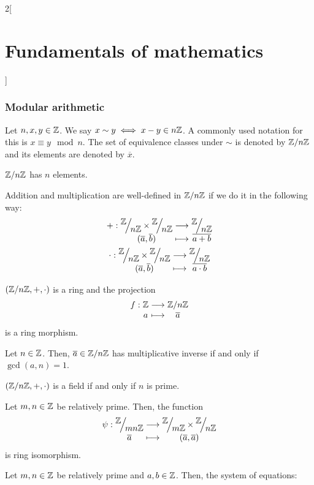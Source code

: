 \documentclass[../../../main_math.tex]{subfiles}
\begin{document}
\begin{multicols}{2}[\section{Fundamentals of mathematics}]
  \subsubsection{Modular arithmetic}
  \begin{definition}
    Let $n,x,y\in\mathbb{Z}$. We say $x\sim y\iff x-y\in n\mathbb{Z}$. A commonly used notation for this is $x\equiv y\mod n$. The set of equivalence classes under $\sim$ is denoted by $\quot{\ZZ}{n\ZZ}$ and its elements are denoted by $\overline{x}$.
  \end{definition}
  \begin{lemma}
    $\quot{\ZZ}{n\ZZ}$ has $n$ elements.
  \end{lemma}
  \begin{proposition}
    Addition and multiplication are well-defined in $\quot{\ZZ}{n\ZZ}$ if we do it in the following way:
    \begin{gather*}
      \function{+}{\displaystyle\quot{\ZZ}{n\ZZ}\times\quot{\ZZ}{n\ZZ}}{\displaystyle\quot{\ZZ}{n\ZZ}}{(\overline{a},\overline{b})}{\overline{a+b}}\\
      \function{\cdot}{\displaystyle\quot{\ZZ}{n\ZZ}\times\quot{\ZZ}{n\ZZ}}{\displaystyle\quot{\ZZ}{n\ZZ}}{(\overline{a},\overline{b})}{\overline{a\cdot b}}
    \end{gather*}
  \end{proposition}
  \begin{theorem}
    $(\quot{\ZZ}{n\ZZ},+,\cdot)$ is a ring and the projection
    $$\function{f}{\ZZ}{\quot{\ZZ}{n\ZZ}}{a}{\overline{a}}$$
    is a ring morphism.
  \end{theorem}
  \begin{lemma}
    Let $n\in\mathbb{Z}$. Then, $\overline{a}\in\quot{\ZZ}{n\ZZ}$ has multiplicative inverse if and only if $\gcd(a,n)=1$.
  \end{lemma}
  \begin{corollary}
    $(\quot{\ZZ}{n\ZZ},+,\cdot)$ is a field if and only if $n$ is prime.
  \end{corollary}
  \begin{theorem}
    Let $m,n\in\mathbb{Z}$ be relatively prime. Then, the function
    $$
      \function{\psi}{\displaystyle\quot{\ZZ}{mn\ZZ}}{\displaystyle\quot{\ZZ}{m\ZZ}\times\quot{\ZZ}{n\ZZ}}{\overline{a}}{(\overline{a},\overline{a})}\\
    $$
    is ring isomorphism.
  \end{theorem}
  \begin{corollary}
    Let $m,n\in\mathbb{Z}$ be relatively prime and $a,b\in\mathbb{Z}$. Then, the system of equations:

\end{corollary}
\end{multicols}
\end{document}
